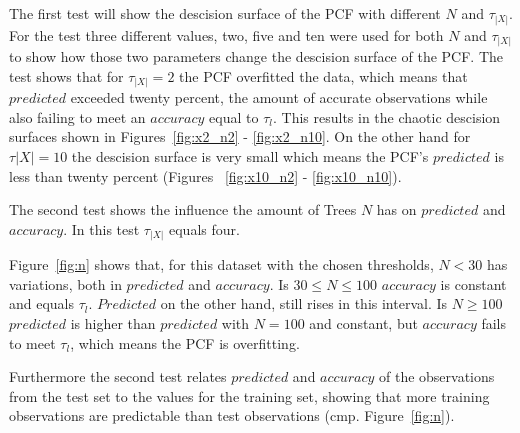 The first test will show the descision surface of the PCF
with different $N$ and $\tau_{|X|}$. For the test three
different values, two, five and ten were used for both $N$
and $\tau_{|X|}$ to show how those two parameters change
the descision surface of the PCF. The test shows that for
$\tau_{|X|} = 2$ the PCF overfitted the data, which means
that $predicted$ exceeded twenty percent, the amount of
accurate observations while also failing to meet an
$accuracy$ equal to $\tau_l$. This results in the chaotic
descision surfaces shown in Figures~\ref{fig:x2_n2} -
\ref{fig:x2_n10}. On the other hand for $\tau{|X|} = 10$
the descision surface is very small which means the PCF's
$predicted$ is less than twenty percent (Figures~%
\ref{fig:x10_n2} - \ref{fig:x10_n10}).

The second test shows the influence the amount of Trees $N$
has on $predicted$ and $accuracy$. In this test
$\tau_{|X|}$ equals four.

Figure~\ref{fig:n} shows that, for this dataset with the
chosen thresholds, $N < 30$ has variations, both in
$predicted$ and $accuracy$. Is $30 \leq N \leq 100$
$accuracy$ is constant and equals $\tau_l$. $Predicted$ on
the other hand, still rises in this interval. Is
$N \geq 100$ $predicted$ is higher than $predicted$ with
$N = 100$ and constant, but $accuracy$ fails to meet
$\tau_l$, which means the PCF is overfitting.

Furthermore the second test relates $predicted$ and
$accuracy$ of the observations from the test set to the
values for the training set, showing that more training
observations are predictable than test observations
(cmp. Figure~\ref{fig:n}).







